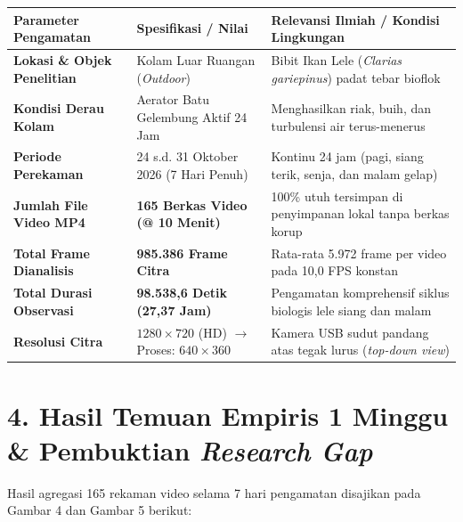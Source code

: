 \documentclass[10pt,a4paper]{article}
\begin{document}
\vspace{-6pt}

\begin{table}[h!]
\centering
\small
\begin{tabular}{|l|l|p{9.5cm}|}
\hline
\textbf{Parameter Pengamatan} & \textbf{Spesifikasi / Nilai} & \textbf{Relevansi Ilmiah / Kondisi Lingkungan} \\
\hline
\textbf{Lokasi \& Objek Penelitian} & Kolam Luar Ruangan (\textit{Outdoor}) & Bibit Ikan Lele (\textit{Clarias gariepinus}) padat tebar bioflok \\
\textbf{Kondisi Derau Kolam} & Aerator Batu Gelembung Aktif 24 Jam & Menghasilkan riak, buih, dan turbulensi air terus-menerus \\
\textbf{Periode Perekaman} & 24 s.d. 31 Oktober 2026 (7 Hari Penuh) & Kontinu 24 jam (pagi, siang terik, senja, dan malam gelap) \\
\textbf{Jumlah File Video MP4} & \textbf{165 Berkas Video (@ 10 Menit)} & 100\% utuh tersimpan di penyimpanan lokal tanpa berkas korup \\
\textbf{Total Frame Dianalisis} & \textbf{985.386 Frame Citra} & Rata-rata 5.972 frame per video pada 10,0 FPS konstan \\
\textbf{Total Durasi Observasi} & \textbf{98.538,6 Detik (27,37 Jam)} & Pengamatan komprehensif siklus biologis lele siang dan malam \\
\textbf{Resolusi Citra} & $1280 \times 720$ (HD) $\rightarrow$ Proses: $640 \times 360$ & Kamera USB sudut pandang atas tegak lurus (\textit{top-down view}) \\
\hline
\end{tabular}
\end{table}

\vspace{-4pt}

\section*{4. Hasil Temuan Empiris 1 Minggu \& Pembuktian \textit{Research Gap}}

Hasil agregasi 165 rekaman video selama 7 hari pengamatan disajikan pada Gambar 4 dan Gambar 5 berikut:
\end{document}

